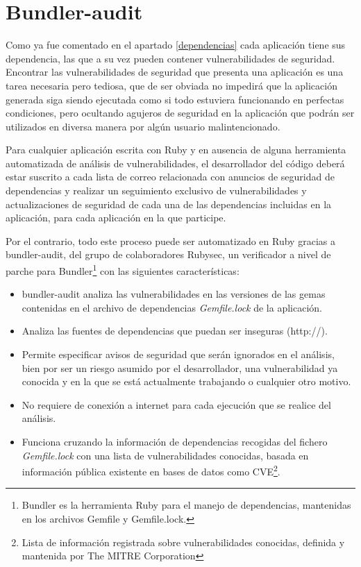 \section{Bundler-audit}

Como ya fue comentado en el apartado \ref{dependencias} cada aplicación tiene sus dependencia, las que a su vez pueden contener vulnerabilidades de seguridad. Encontrar las vulnerabilidades de seguridad que presenta una aplicación es una tarea necesaria pero tediosa, que de ser obviada no impedirá que la aplicación generada siga siendo ejecutada como si todo estuviera funcionando en perfectas condiciones, pero ocultando agujeros de seguridad en la aplicación que podrán ser utilizados en diversa manera por algún usuario malintencionado.

Para cualquier aplicación escrita con Ruby y en ausencia de alguna herramienta automatizada de análisis de vulnerabilidades, el desarrollador del código deberá estar suscrito a cada lista de correo relacionada con anuncios de seguridad de dependencias y realizar un seguimiento exclusivo de vulnerabilidades y actualizaciones de seguridad de cada una de las dependencias incluidas en la aplicación, para cada aplicación en la que participe\cite{prescott2015}.

Por el contrario, todo este proceso puede ser automatizado en Ruby gracias a bundler-audit\cite{bundleaudit2017}, del grupo de colaboradores Rubysec, un verificador a nivel de parche para Bundler\footnote{Bundler es la herramienta Ruby para el manejo de dependencias, mantenidas en los archivos Gemfile y Gemfile.lock.} con las siguientes características:

\begin{itemize}
	\item bundler-audit analiza las vulnerabilidades en las versiones de las gemas contenidas en el archivo de dependencias \textit{Gemfile.lock} de la aplicación.
	\item Analiza las fuentes de dependencias que puedan ser inseguras (http://).
	\item Permite especificar avisos de seguridad que serán ignorados en el análisis, bien por ser un riesgo asumido por el desarrollador, una vulnerabilidad ya conocida y en la que se está actualmente trabajando o cualquier otro motivo.
	\item No requiere de conexión a internet para cada ejecución que se realice del análisis.
	\item Funciona cruzando la información de dependencias recogidas del fichero \textit{Gemfile.lock} con una lista de vulnerabilidades conocidas\cite{advisorydb2017}, basada en información pública existente en bases de datos como \gls{CVE}\footnote{Lista de información registrada sobre vulnerabilidades conocidas, definida y mantenida por The MITRE Corporation}.
\end{itemize}

